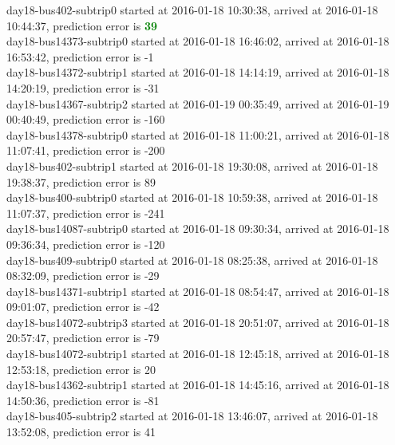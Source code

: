 \documentclass[12pt,a4paper,oneside,openright]{report}
\begin{document}
{day18-bus402-subtrip0 started at 2016-01-18 10:30:38,    arrived at 2016-01-18 10:44:37, prediction error is \textcolor{green}{\textbf{39}} \\
day18-bus14373-subtrip0 started at 2016-01-18 16:46:02, arrived at 2016-01-18 16:53:42, prediction error is -1 \\
day18-bus14372-subtrip1 started at 2016-01-18 14:14:19, arrived at 2016-01-18 14:20:19, prediction error is -31 \\
day18-bus14367-subtrip2 started at 2016-01-19 00:35:49, arrived at 2016-01-19 00:40:49, prediction error is -160 \\
day18-bus14378-subtrip0 started at 2016-01-18 11:00:21, arrived at 2016-01-18 11:07:41, prediction error is -200 \\
day18-bus402-subtrip1 started at 2016-01-18 19:30:08,    arrived at 2016-01-18 19:38:37, prediction error is 89 \\
day18-bus400-subtrip0 started at 2016-01-18 10:59:38,    arrived at 2016-01-18 11:07:37, prediction error is -241 \\
day18-bus14087-subtrip0 started at 2016-01-18 09:30:34, arrived at 2016-01-18 09:36:34, prediction error is -120 \\
day18-bus409-subtrip0 started at 2016-01-18 08:25:38,    arrived at 2016-01-18 08:32:09, prediction error is -29 \\
day18-bus14371-subtrip1 started at 2016-01-18 08:54:47, arrived at 2016-01-18 09:01:07, prediction error is -42 \\
day18-bus14072-subtrip3 started at 2016-01-18 20:51:07, arrived at 2016-01-18 20:57:47, prediction error is -79 \\
day18-bus14072-subtrip1 started at 2016-01-18 12:45:18, arrived at 2016-01-18 12:53:18, prediction error is 20 \\
day18-bus14362-subtrip1 started at 2016-01-18 14:45:16, arrived at 2016-01-18 14:50:36, prediction error is -81 \\
day18-bus405-subtrip2 started at 2016-01-18 13:46:07,    arrived at 2016-01-18 13:52:08, prediction error is 41 \\
}
\end{document}
